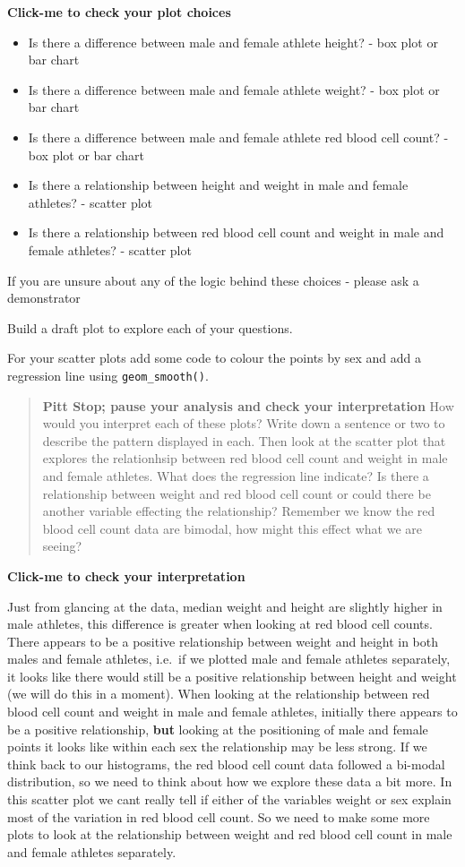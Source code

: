 \documentclass[
]{book}
\providecommand{\tightlist}{%
  \setlength{\itemsep}{0pt}\setlength{\parskip}{0pt}}
\begin{document}
\textbf{Click-me to check your plot choices}

\begin{itemize}
\tightlist
\item
  Is there a difference between male and female athlete height? - box plot or bar chart
\item
  Is there a difference between male and female athlete weight? - box plot or bar chart
\item
  Is there a difference between male and female athlete red blood cell count? - box plot or bar chart
\item
  Is there a relationship between height and weight in male and female athletes? - scatter plot
\item
  Is there a relationship between red blood cell count and weight in male and female athletes? - scatter plot
\end{itemize}

If you are unsure about any of the logic behind these choices - please ask a demonstrator

Build a draft plot to explore each of your questions.

For your scatter plots add some code to colour the points by sex and add a regression line using \texttt{geom\_smooth()}.

\begin{quote}
\textbf{Pitt Stop; pause your analysis and check your interpretation}
How would you interpret each of these plots? Write down a sentence or two to describe the pattern displayed in each. Then look at the scatter plot that explores the relationhsip between red blood cell count and weight in male and female athletes. What does the regression line indicate? Is there a relationship between weight and red blood cell count or could there be another variable effecting the relationship? Remember we know the red blood cell count data are bimodal, how might this effect what we are seeing?
\end{quote}

\textbf{Click-me to check your interpretation}

Just from glancing at the data, median weight and height are slightly higher in male athletes, this difference is greater when looking at red blood cell counts. There appears to be a positive relationship between weight and height in both males and female athletes, i.e.~if we plotted male and female athletes separately, it looks like there would still be a positive relationship between height and weight (we will do this in a moment). When looking at the relationship between red blood cell count and weight in male and female athletes, initially there appears to be a positive relationship, \textbf{but} looking at the positioning of male and female points it looks like within each sex the relationship may be less strong. If we think back to our histograms, the red blood cell count data followed a bi-modal distribution, so we need to think about how we explore these data a bit more. In this scatter plot we cant really tell if either of the variables weight or sex explain most of the variation in red blood cell count. So we need to make some more plots to look at the relationship between weight and red blood cell count in male and female athletes separately.
\end{document}
